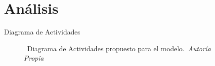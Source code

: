 \section{Análisis}

\begin{frame}{Diagrama de Actividades}%
    \vspace{-0.15cm}
    \begin{figure}[H]
        \centering
        \href{run:C:/Users/emicr/Documents/ESCOLARES/ESCOM/TRABAJO TERMINAL/Presentacion/img/Analisis/DiagramaProcesos/DiagramasAnalisis.drawio}{%
        }
        \vspace{-0.25cm}
        \caption{\tiny~Diagrama de Actividades propuesto para el modelo.~\textit{Autoría Propia}}%
        \label{fig:activities_diagram}
    \end{figure}
\end{frame}